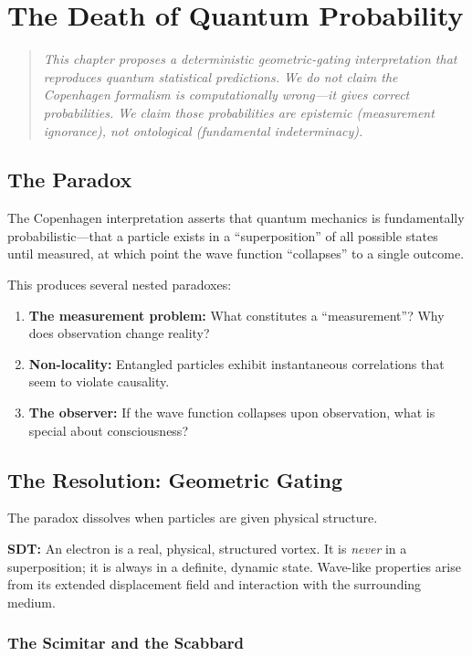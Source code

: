 \chapter{The Death of Quantum Probability}
\label{ch:quantum-probability}

\begin{quote}
\emph{This chapter proposes a deterministic geometric-gating interpretation that reproduces quantum statistical predictions. We do not claim the Copenhagen formalism is computationally wrong---it gives correct probabilities. We claim those probabilities are epistemic (measurement ignorance), not ontological (fundamental indeterminacy).}
\end{quote}

\section{The Paradox}

The Copenhagen interpretation asserts that quantum mechanics is fundamentally probabilistic---that a particle exists in a ``superposition'' of all possible states until measured, at which point the wave function ``collapses'' to a single outcome.

This produces several nested paradoxes:
\begin{enumerate}
  \item \textbf{The measurement problem:} What constitutes a ``measurement''? Why does observation change reality?
  \item \textbf{Non-locality:} Entangled particles exhibit instantaneous correlations that seem to violate causality.
  \item \textbf{The observer:} If the wave function collapses upon observation, what is special about consciousness?
\end{enumerate}


\section{The Resolution: Geometric Gating}

The paradox dissolves when particles are given physical structure.

\textbf{SDT:} An electron is a real, physical, structured vortex. It is \emph{never} in a superposition; it is always in a definite, dynamic state. Wave-like properties arise from its extended displacement field and interaction with the surrounding medium.

\subsection{The Scimitar and the Scabbard}

